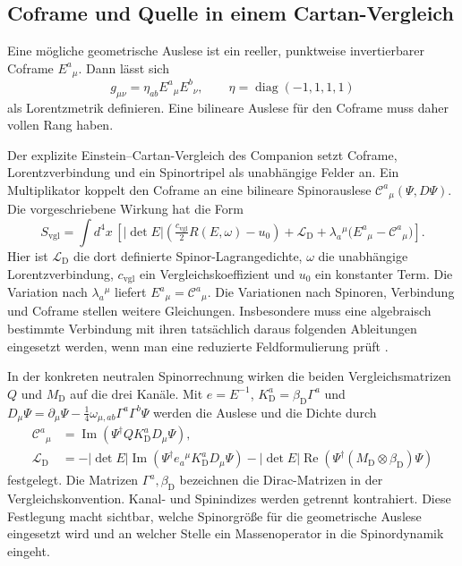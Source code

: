 \subsection{Coframe und Quelle in einem Cartan-Vergleich}

Eine mögliche geometrische Auslese ist ein reeller, punktweise invertierbarer Coframe \(E^a{}_\mu\). Dann lässt sich
\begin{equation}
 g_{\mu\nu}=\eta_{ab}E^a{}_\mu E^b{}_\nu,\qquad
 \eta=\operatorname{diag}(-1,1,1,1)
 \label{eq:metric}
\end{equation}
als Lorentzmetrik definieren. Eine bilineare Auslese für den Coframe muss daher vollen Rang haben.

Der explizite Einstein--Cartan-Vergleich des Companion setzt Coframe, Lorentzverbindung und ein Spinortripel als unabhängige Felder an. Ein Multiplikator koppelt den Coframe an eine bilineare Spinorauslese \(\mathcal C^a{}_\mu(\Psi,D\Psi)\). Die vorgeschriebene Wirkung hat die Form
\begin{equation}
 S_{\mathrm{vgl}}=\int\! d^4x\,
 \left[\left|\det E\right|\left(\tfrac{c_{\mathrm{vgl}}}2 R(E,\omega)-u_0\right)
 +\mathcal L_{\mathrm D}
 +\lambda_a{}^\mu\bigl(E^a{}_\mu-\mathcal C^a{}_\mu\bigr)\right].
 \label{eq:cartan}
\end{equation}
Hier ist \(\mathcal L_{\mathrm D}\) die dort definierte Spinor-Lagrangedichte, \(\omega\) die unabhängige Lorentzverbindung, \(c_{\mathrm{vgl}}\) ein Vergleichskoeffizient und \(u_0\) ein konstanter Term. Die Variation nach \(\lambda_a{}^\mu\) liefert \(E^a{}_\mu=\mathcal C^a{}_\mu\). Die Variationen nach Spinoren, Verbindung und Coframe stellen weitere Gleichungen. Insbesondere muss eine algebraisch bestimmte Verbindung mit ihren tatsächlich daraus folgenden Ableitungen eingesetzt werden, wenn man eine reduzierte Feldformulierung prüft \cite{companion,repo}.

In der konkreten neutralen Spinorrechnung wirken die beiden Vergleichsmatrizen \(Q\) und \(M_{\mathrm D}\) auf die drei Kanäle. Mit \(e=E^{-1}\), \(K_{\mathrm D}^a=\beta_{\mathrm D}\Gamma^a\) und \(D_\mu\Psi=\partial_\mu\Psi-\tfrac14\omega_{\mu,ab}\Gamma^a\Gamma^b\Psi\) werden die Auslese und die Dichte durch
\begin{align}
 \mathcal C^a{}_\mu&=\operatorname{Im}(\Psi^\dagger QK_{\mathrm D}^aD_\mu\Psi),\\
 \mathcal L_{\mathrm D}
 &=-|\det E|\operatorname{Im}(\Psi^\dagger e_a{}^\mu K_{\mathrm D}^aD_\mu\Psi)
   -|\det E|\operatorname{Re}(\Psi^\dagger(M_{\mathrm D}\otimes\beta_{\mathrm D})\Psi)
\end{align}
festgelegt. Die Matrizen \(\Gamma^a,\beta_{\mathrm D}\) bezeichnen die Dirac-Matrizen in der Vergleichskonvention. Kanal- und Spinindizes werden getrennt kontrahiert. Diese Festlegung macht sichtbar, welche Spinorgröße für die geometrische Auslese eingesetzt wird und an welcher Stelle ein Massenoperator in die Spinordynamik eingeht.

